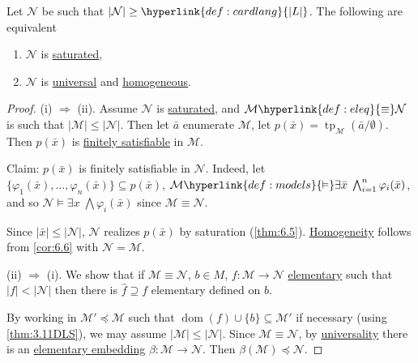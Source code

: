 \documentclass{article}
\let\models\vDash
\DeclareMathOperator{\dom}{dom}
\DeclareMathOperator{\tp}{tp}
\begin{document}
\begin{nthm}\label{thm:6.10}
  Let $\mathcal{N}$ be such that $|\mathcal{N}| \geq \hyperlink{def:cardlang}{|L|}$. The following are equivalent
  \begin{enumerate}[label=(\roman*)]
    \item $\mathcal{N}$ is \hyperlink{def:sat}{saturated},
    \item $\mathcal{N}$ is \hyperlink{def:univ}{universal} and \hyperlink{def:homogeneous}{homogeneous}.
  \end{enumerate}
\end{nthm}
\begin{proof}
  (i) $\Rightarrow$ (ii). Assume $\mathcal{N}$ is \hyperlink{def:sat}{saturated}, and $\mathcal{M} \hyperlink{def:eleq}{\equiv} \mathcal{N}$ is such that $|\mathcal{M}| \leq |\mathcal{N}|$.
  Then let $\bar{a}$ enumerate $\mathcal{M}$, let $p(\bar{x}) = \tp_\mathcal{M}(\bar{a}/\emptyset)$.
  Then $p(\bar{x})$ is \hyperlink{def:type}{finitely satisfiable} in $\mathcal{M}$.

  Claim: $p(\bar{x})$ is finitely satisfiable in $\mathcal{N}$.
  Indeed, let $\{\varphi_1(\bar{x}), \dotsc, \varphi_n(\bar{x})\} \subseteq p(\bar{x})$, $\mathcal{M} \hyperlink{def:models}{\models} \exists \bar{x} \; \bigwedge _{i=1}^n \varphi_i(\bar{x})$, and so $\mathcal{N} \models \exists x \; \bigwedge \varphi_i(\bar{x})$ since $\mathcal{M} \equiv \mathcal{N}$.

  Since $|\bar{x}| \leq |\mathcal{N}|$, $\mathcal{N}$ realizes $p(\bar{x})$ by saturation (\cref{thm:6.5}).
  \hyperlink{def:homogeneous}{Homogeneity} follows from \cref{cor:6.6} with $\mathcal{N} = \mathcal{M}$.

  (ii) $\Rightarrow$ (i). We show that if $\mathcal{M} \equiv \mathcal{N}$, $b \in M$, $f: \mathcal{M} \to \mathcal{N}$ \hyperlink{def:elmap}{elementary} such that $|f| < |\mathcal{N}|$ then there is $\hat{f} \supseteq f$ elementary defined on $b$.

  By working in $\mathcal{M}' \preccurlyeq \mathcal{M}$ such that $\dom(f) \cup \{b\} \subseteq \mathcal{M}'$ if necessary (using \cref{thm:3.11DLS}), we may assume $|\mathcal{M}| \leq |\mathcal{N}|$.
  Since $\mathcal{M} \equiv \mathcal{N}$, by \hyperlink{def:univ}{universality} there is an \hyperlink{def:el}{elementary embedding} $\beta: \mathcal{M} \to \mathcal{N}$. Then $\beta(\mathcal{M}) \preccurlyeq \mathcal{N}$.


\end{proof}
\end{document}
